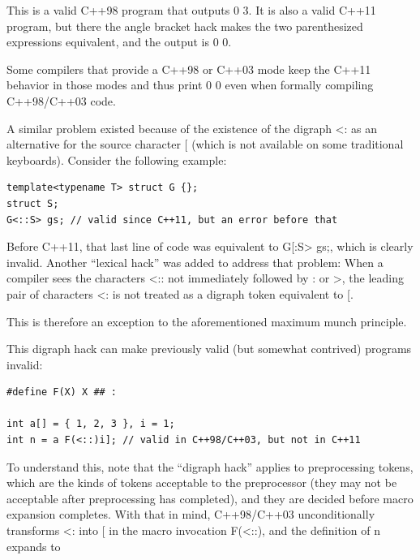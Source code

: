 This is a valid C++98 program that outputs 0 3. It is also a valid C++11 program, but there the angle bracket hack makes the two parenthesized expressions equivalent, and the output is 0 0.

\begin{tcolorbox}[colback=webgreen!5!white,colframe=webgreen!75!black]
\hspace*{0.75cm}Some compilers that provide a C++98 or C++03 mode keep the C++11 behavior in those modes and thus print 0 0 even when formally compiling C++98/C++03 code.
\end{tcolorbox}

A similar problem existed because of the existence of the digraph <: as an alternative for the source character [ (which is not available on some traditional keyboards). Consider the following example:

\begin{lstlisting}[style=styleCXX]
template<typename T> struct G {};
struct S;
G<::S> gs; // valid since C++11, but an error before that
\end{lstlisting}

Before C++11, that last line of code was equivalent to G[:S> gs;, which is clearly invalid. Another “lexical hack” was added to address that problem: When a compiler sees the characters <:: not immediately followed by : or >, the leading pair of characters <: is not treated as a digraph token equivalent to [.

\begin{tcolorbox}[colback=webgreen!5!white,colframe=webgreen!75!black]
\hspace*{0.75cm}This is therefore an exception to the aforementioned maximum munch principle.
\end{tcolorbox}

This digraph hack can make previously valid (but somewhat contrived) programs invalid:

\begin{lstlisting}[style=styleCXX]
#define F(X) X ## :

int a[] = { 1, 2, 3 }, i = 1;
int n = a F(<::)i]; // valid in C++98/C++03, but not in C++11
\end{lstlisting}

To understand this, note that the “digraph hack” applies to preprocessing tokens, which are the kinds of tokens acceptable to the preprocessor (they may not be acceptable after preprocessing has completed), and they are decided before macro expansion completes. With that in mind, C++98/C++03 unconditionally transforms <: into [ in the macro invocation F(<::), and the definition of n expands to


